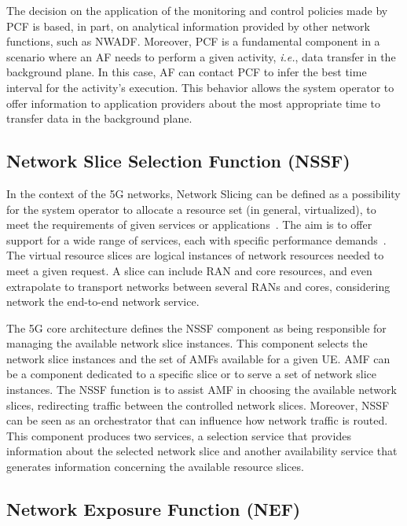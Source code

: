 The decision on the application of the monitoring and control policies made by PCF is based, in part, on analytical information provided by other network functions, such as NWADF. Moreover, PCF is a fundamental component in a scenario where an AF needs to perform a given activity, \textit{i.e.}, data transfer in the background plane. In this case, AF can contact PCF to infer the best time interval for the activity's execution. This behavior allows the system operator to offer information to application providers about the most appropriate time to transfer data in the background plane.


\subsection*{Network Slice Selection Function (NSSF)}

In the context of the 5G networks, Network Slicing can be defined as a possibility for the system operator to allocate a resource set (in general, virtualized), to meet the requirements of given services or applications~\cite{7784887}. The aim is to offer support for a wide range of services, each with specific performance demands~\cite{foukas2017network}. The virtual resource slices are logical instances of network resources needed to meet a given request. A slice can include RAN and core resources, and even extrapolate to transport networks between several RANs and cores, considering network the end-to-end network service.


The 5G core architecture defines the NSSF component as being responsible for managing the available network slice instances. This component selects the network slice instances and the set of AMFs available for a given UE. AMF can be a component dedicated to a specific slice or to serve a set of network slice instances. The NSSF function is to assist AMF in choosing the available network slices, redirecting traffic between the controlled network slices. Moreover, NSSF can be seen as an orchestrator that can influence how network traffic is routed. This component produces two services, a selection service that provides information about the selected network slice and another availability service that generates information concerning the available resource slices.


\subsection*{Network Exposure Function (NEF)}

